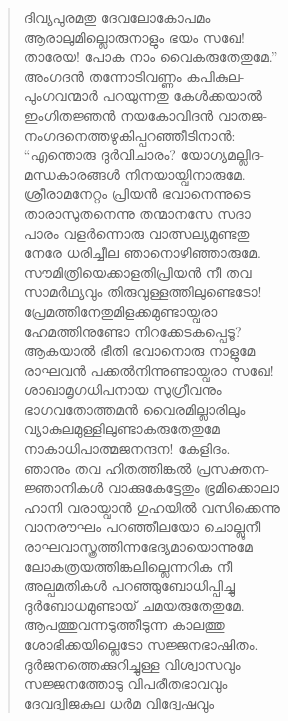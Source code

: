 \begin{verse}
ദിവ്യപുരമതു ദേവലോകോപമം\\
ആരാലുമില്ലൊരുനാളും ഭയം സഖേ!\\
താരേയ! പോക നാം വൈകരുതേതുമേ.”\\
അംഗദന്‍ തന്നോടിവണ്ണം കപികുല-\\
പുംഗവന്മാര്‍ പറയുന്നതു കേള്‍ക്കയാല്‍\\
ഇംഗിതജ്ഞന്‍ നയകോവിദന്‍ വാതജ-\\
നംഗദനെത്തഴുകിപ്പറഞ്ഞീടിനാന്‍:\\
“എന്തൊരു ദുര്‍വിചാരം? യോഗ്യമല്ലിദ-\\
മന്ധകാരങ്ങള്‍ നിനയായ്വിനാരുമേ.\\
ശ്രീരാമനേറ്റം പ്രിയന്‍ ഭവാനെന്നുടെ\\
താരാസുതനെന്നു തന്മാനസേ സദാ\\
പാരം വളര്‍ന്നൊരു വാത്സല്യമുണ്ടതു\\
നേരേ ധരിച്ചീല ഞാനൊഴിഞ്ഞാരുമേ.\\
സൗമിത്രിയെക്കാളതിപ്രിയന്‍ നീ തവ\\
സാമര്‍ഥ്യവും തിരുവുള്ളത്തിലുണ്ടെടോ!\\
പ്രേമത്തിനേതുമിളക്കമുണ്ടായ്വരാ\\
ഹേമത്തിനുണ്ടോ നിറക്കേടകപ്പെടൂ?\\
ആകയാല്‍ ഭീതി ഭവാനൊരു നാളുമേ\\
രാഘവന്‍ പക്കല്‍നിന്നുണ്ടായ്വരാ സഖേ!\\
ശാഖാമൃഗധിപനായ സുഗ്രീവനും\\
ഭാഗവതോത്തമന്‍ വൈരമില്ലാരിലും\\
വ്യാകുലമുള്ളിലുണ്ടാകരുതേതുമേ\\
നാകാധിപാത്മജനന്ദന! കേളിദം.\\
ഞാനും തവ ഹിതത്തിങ്കല്‍ പ്രസക്തന-\\
ജ്ഞാനികള്‍ വാക്കുകേട്ടേതും ഭ്രമിക്കൊലാ\\
ഹാനി വരായ്വാന്‍ ഗുഹയില്‍ വസിക്കെന്നു\\
വാനരൗഘം പറഞ്ഞീലയോ ചൊല്ലുനീ\\
രാഘവാസ്ത്രത്തിന്നഭേദ്യമായൊന്നുമേ\\
ലോകത്രയത്തിങ്കലില്ലെന്നറിക നീ\\
അല്പമതികള്‍ പറഞ്ഞുബോധിപ്പിച്ചു\\
ദുര്‍ബോധമുണ്ടായ് ചമയരുതേതുമേ.\\
ആപത്തുവന്നടുത്തീടുന്ന കാലത്തു\\
ശോഭിക്കയില്ലെടോ സജ്ജനഭാഷിതം.\\
ദുര്‍ജനത്തെക്കുറിച്ചുള്ള വിശ്വാസവും\\
സജ്ജനത്തോടു വിപരീതഭാവവും\\
ദേവദ്വിജകുല ധര്‍മ വിദ്വേഷവും\\

\end{verse}
